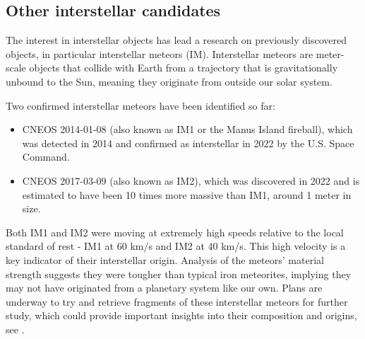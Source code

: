 \subsection{Other interstellar candidates}

The interest in interstellar objects has lead a research on previously
discovered objects, in particular interstellar meteors (IM). Interstellar
meteors are meter-scale objects that collide with Earth from a trajectory that
is gravitationally unbound to the Sun, meaning they originate from outside our
solar system. 

Two confirmed interstellar meteors have been identified so far:

\begin{itemize}
  \item CNEOS 2014-01-08 (also known as IM1 or the Manus Island fireball), which
    was detected in 2014 and confirmed as interstellar in 2022 by the U.S. Space
    Command.
  \item CNEOS 2017-03-09 (also known as IM2), which was discovered in 2022 and is
    estimated to have been 10 times more massive than IM1, around 1 meter in
    size.
\end{itemize}

Both IM1 and IM2 were moving at extremely high speeds relative to the local
standard of rest - IM1 at 60 km/s and IM2 at 40 km/s. This high velocity is a
key indicator of their interstellar origin. Analysis of the meteors' material
strength suggests they were tougher than typical iron meteorites, implying they
may not have originated from a planetary system like our own. Plans are underway
to try and retrieve fragments of these interstellar meteors for further study,
which could provide important insights into their composition and origins, see
\cite{siraj2022discovery}.
